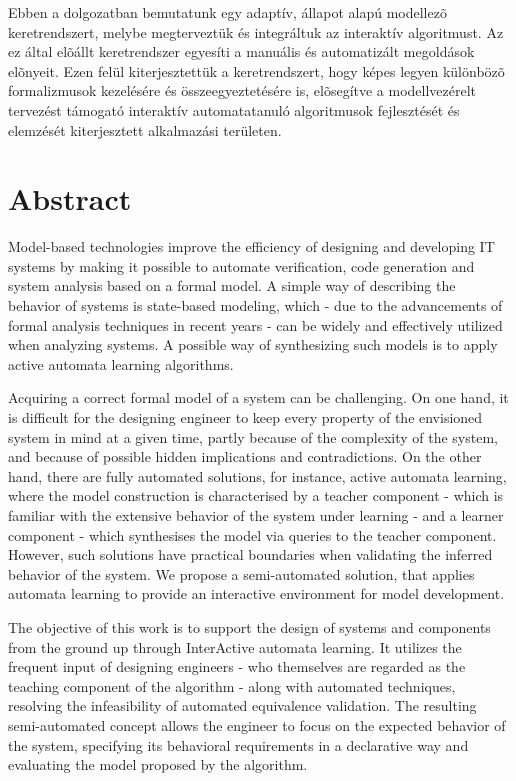 Ebben a dolgozatban bemutatunk egy adaptív, állapot alapú modellez\~{o} keretrendszert, melybe megterveztük és integráltuk az interaktív algoritmust. Az ez által el\~{o}állt keretrendszer egyesíti a manuális és automatizált megoldások el\~{o}nyeit. Ezen felül kiterjesztettük a keretrendszert, hogy képes legyen különböz\~{o} formalizmusok kezelésére és összeegyeztetésére is, el\~{o}segítve a modellvezérelt tervezést támogató interaktív automatatanuló algoritmusok fejlesztését és elemzését kiterjesztett alkalmazási területen.


\vfill
\selectenglish


\chapter*{Abstract}

Model-based technologies improve the efficiency of designing and developing IT systems by making it possible to automate verification, code generation and system analysis based on a formal model. A simple way of describing the behavior of systems is state-based modeling, which - due to the advancements of formal analysis techniques in recent years - can be widely and effectively utilized when analyzing systems. A possible way of synthesizing such models is to apply active automata learning algorithms.

Acquiring a correct formal model of a system can be challenging. On one hand, it is difficult for the designing engineer to keep every property of the envisioned system in mind at a given time, partly because of the complexity of the system, and because of possible hidden implications and contradictions. On the other hand, there are fully automated solutions, for instance, active automata learning, where the model construction is characterised by a teacher component - which is familiar with the extensive behavior of the system under learning - and a learner component - which synthesises the model via queries to the teacher component. However, such solutions have practical boundaries when validating the inferred behavior of the system. We propose a semi-automated solution, that applies automata learning to provide an interactive environment for model development.

The objective of this work is to support the design of systems and components from the ground up through InterActive automata learning. It utilizes the frequent input of designing engineers - who themselves are regarded as the teaching component of the algorithm - along with automated techniques, resolving the infeasibility of automated equivalence validation. The resulting semi-automated concept allows the engineer to focus on the expected behavior of the system, specifying its behavioral requirements in a declarative way and evaluating the model proposed by the algorithm.

